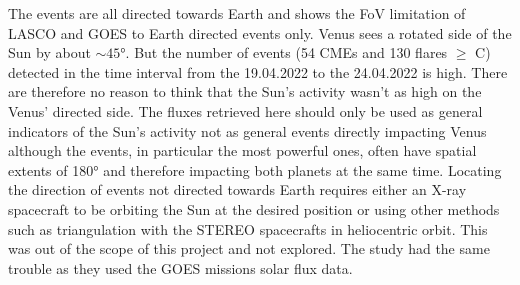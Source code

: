 The events are all directed towards Earth and shows the FoV limitation of LASCO and GOES to Earth directed events only. Venus sees a rotated side of the Sun by about $\sim 45$°. But the number of events (54 CMEs and 130 flares $\geq$ C) detected in the time interval from the 19.04.2022 to the 24.04.2022 is high. There are therefore no reason to think that the Sun's activity wasn't as high on the Venus' directed side. The fluxes retrieved here should only be used as general indicators of the Sun's activity not as general events directly impacting Venus although the events, in particular the most powerful ones, often have spatial extents of 180° and therefore impacting both planets at the same time. Locating the direction of events not directed towards Earth requires either an X-ray spacecraft to be orbiting the Sun at the desired position or using other methods such as triangulation \cite{Liu2010GeometricAU} with the STEREO spacecrafts in heliocentric orbit. This was out of the scope of this project and not explored. The \cite{Dennerl2002DiscoveryChandra} study had the same trouble as they used the GOES missions solar flux data.